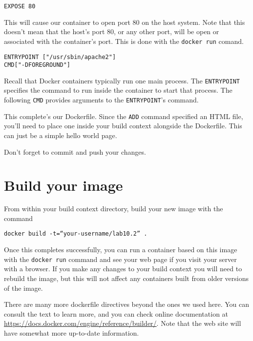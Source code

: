 \documentclass{article}
\begin{document}
\texttt{EXPOSE 80}

This will cause our container to open port 80 on the host system.  Note that this doesn't mean that the host's port 80, or any other port, will be open or associated with the container's port.  This is done with the \texttt{docker run} comand.

\begin{verbatim}
ENTRYPOINT ["/usr/sbin/apache2"]
CMD["-DFOREGROUND"]
\end{verbatim}

Recall that Docker containers typically run one main process.  The \texttt{ENTRYPOINT} specifies the command to run inside the container to start that process. The following \texttt{CMD} provides arguments to the \texttt{ENTRYPOINT}'s command.

This complete's our Dockerfile.  Since the \texttt{ADD} command specified an HTML file, you'll need to place one inside your build context alongside the Dockerfile. This can just be a simple hello world page.

Don't forget to commit and push your changes.

\section{Build your image}
From within your build context directory, build your new image with the command

\texttt{docker build -t=``your-username/lab10.2'' .}

Once this completes successfully, you can run a container based on this image with the \texttt{docker run} command and see your web page if you visit your server with a browser. If you make any changes  to your build context you will need to rebuild the image, but this will not affect any containers built from older versions of the image.

There are many more dockerfile directives beyond the ones we used here. You can consult the text to learn more, and you can check online documentation at \url{https://docs.docker.com/engine/reference/builder/}. Note that the web site will have somewhat more up-to-date information.
\end{document}
